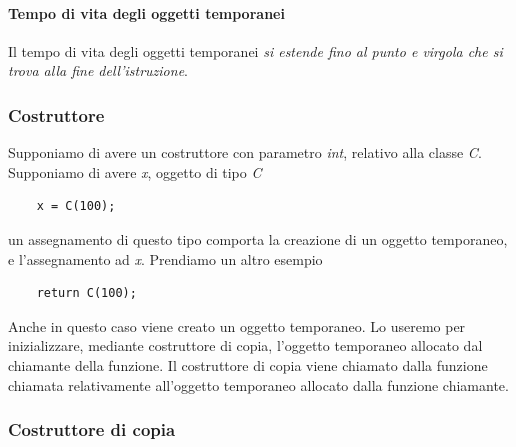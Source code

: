 \paragraph{Tempo di vita degli oggetti temporanei} Il tempo di vita degli oggetti temporanei \emph{si estende fino al punto e virgola che si trova alla fine dell'istruzione}.
\subsubsection{Costruttore}
Supponiamo di avere un costruttore con parametro \emph{int}, relativo alla classe \emph{C}. Supponiamo di avere \emph{x}, oggetto di tipo \emph{C}
\begin{verbatim}
	x = C(100);
\end{verbatim}
un assegnamento di questo tipo comporta la creazione di un oggetto temporaneo, e l'assegnamento ad \emph{x}. Prendiamo un altro esempio
\begin{verbatim}
	return C(100);
\end{verbatim}
Anche in questo caso viene creato un oggetto temporaneo.  Lo useremo per inizializzare, mediante costruttore di copia, l'oggetto temporaneo allocato dal chiamante della funzione. Il costruttore di copia viene chiamato dalla funzione chiamata relativamente all'oggetto temporaneo allocato dalla funzione chiamante.

\subsubsection{Costruttore di copia}
